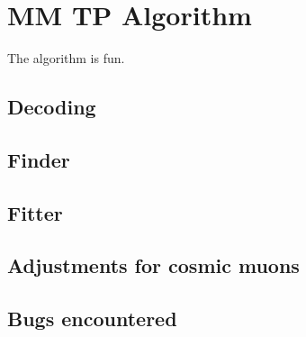 \section{MM TP Algorithm}
\label{sec:alg}

The algorithm is fun.

\subsection{Decoding}
\label{sec:alg-decode}

\subsection{Finder}
\label{sec:alg-finder}

\subsection{Fitter}
\label{sec:alg-fitter}

\subsection{Adjustments for cosmic muons}
\label{sec:alg-crts}

\subsection{Bugs encountered}
\label{sec:alg-bugs}


